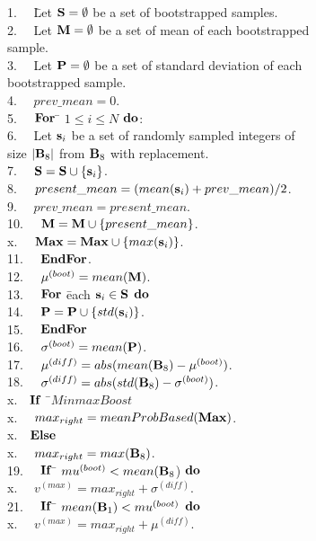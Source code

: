 \documentclass[lettersize,journal]{IEEEtran}
\begin{document}
\begin{tabbing}
1.~~ \= Let ${\bf S} = \emptyset$ be a set of bootstrapped samples. \\
2.~~ \> Let ${\bf M} = \emptyset$ be a set of mean of each bootstrapped \\
     \> sample. \\
3.~~ \> Let ${\bf P} = \emptyset$ be a set of standard deviation of each \\
     \> bootstrapped sample. \\
4.~~ \> $prev\_mean = 0$. \\
5.~~ \> ${\bf For}$ \= $1 \leq i \leq N$ ${\bf do}$: \\
6.~~ \>             \> Let ${\bf s}_{i}$ be a set of randomly sampled integers of \\
     \>             \> size $|{\bf B}_{8}|$ from ${\bf B}_{8}$ with replacement. \\
7.~~ \>             \> ${\bf S} = {\bf S} \cup \{{\bf s}_{i}\}$. \\
8.~~ \>             \> $present\_mean = (mean({\bf s}_{i}) + prev\_mean)/2$. \\
9.~~ \>             \> $prev\_mean = present\_mean$. \\
10.~~\>             \> ${\bf M} = {\bf M} \cup \{present\_mean\}$. \\
x.~~\>             \> ${\bf Max} = {\bf Max} \cup \{max({\bf s}_i)\}$. \\
11.~~\> ${\bf EndFor}$. \\
12.~~\> $\mu^{(boot)} = mean({\bf M})$. \\
13.~~\> ${\bf For}$ \= each ${\bf s}_{i} \in {\bf S}$ ${\bf do}$ \\
14.~~\>             \> ${\bf P} = {\bf P} \cup \{std({\bf s}_{i})\}$. \\
15.~~\> ${\bf EndFor}$ \\
16.~~\> $\sigma^{(boot)} = mean({\bf P})$. \\
17.~~\> $\mu^{(diff)} = abs(mean({\bf B}_{8}) - \mu^{(boot)})$. \\
18.~~\> $\sigma^{(diff)} = abs(std({\bf B}_{8}) - \sigma^{(boot)})$. \\
x.~~\>${\bf If}$ \,\=\,$MinmaxBoost$\\
x.~~\>     \> $max_{right} = meanProbBased({\bf Max})$.\\
x.~~\>${\bf Else}$\\
x.~~\>      \> $max_{right} = max({\bf B}_{8})$.\\
19.~~\> ${\bf If}$ \= $mu^{(boot)} < mean({\bf B}_{8}$) ${\bf do}$ \\
x.~~\>            \> $v^{(max)} = max_{right} + \sigma^{(diff)}$. \\ 
21.~~\> ${\bf If}$ \= $mean({\bf B}_{1}) < mu^{(boot)}$ ${\bf do}$ \\
x.~~\>            \> $v^{(max)} = max_{right} + \mu^{(diff)}$. \\ 
\end{tabbing}
\end{document}
